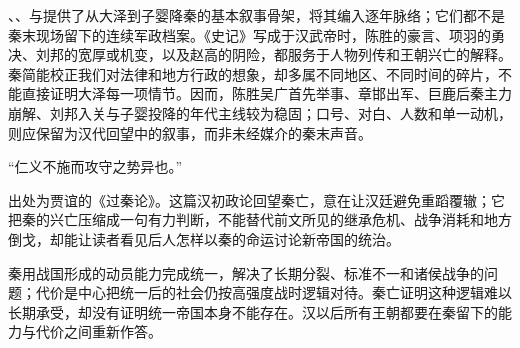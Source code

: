 \begin{sourcenote}[谁把秦亡写成了这个样子]
、、与提供了从大泽到子婴降秦的基本叙事骨架，将其编入逐年脉络；它们都不是秦末现场留下的连续军政档案。《史记》写成于汉武帝时，陈胜的豪言、项羽的勇决、刘邦的宽厚或机变，以及赵高的阴险，都服务于人物列传和王朝兴亡的解释。秦简能校正我们对法律和地方行政的想象，却多属不同地区、不同时间的碎片，不能直接证明大泽每一项情节。因而，陈胜吴广首先举事、章邯出军、巨鹿后秦主力崩解、刘邦入关与子婴投降的年代主线较为稳固；口号、对白、人数和单一动机，则应保留为汉代回望中的叙事，而非未经媒介的秦末声音。
\end{sourcenote}

\begin{textwindow}[贾谊《过秦论》]
“仁义不施而攻守之势异也。”

出处为贾谊的《过秦论》。这篇汉初政论回望秦亡，意在让汉廷避免重蹈覆辙；它把秦的兴亡压缩成一句有力判断，不能替代前文所见的继承危机、战争消耗和地方倒戈，却能让读者看见后人怎样以秦的命运讨论新帝国的统治。
\end{textwindow}

\begin{turningpoint}
秦用战国形成的动员能力完成统一，解决了长期分裂、标准不一和诸侯战争的问题；代价是中心把统一后的社会仍按高强度战时逻辑对待。秦亡证明这种逻辑难以长期承受，却没有证明统一帝国本身不能存在。汉以后所有王朝都要在秦留下的能力与代价之间重新作答。
\end{turningpoint}
